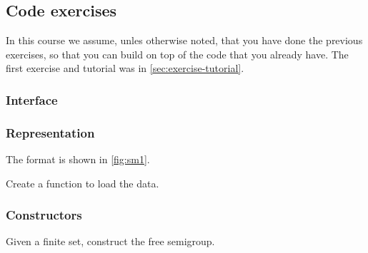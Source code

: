 \subsection{Code exercises}

\begin{remark}
  In this course we assume, unles otherwise noted, that you have done the previous exercises, so that you can build on top of the code that you already have. The first exercise and tutorial was in \cref{sec:exercise-tutorial}.
\end{remark}

\subsubsection*{Interface}


\subsubsection*{Representation}

The format is shown in \cref{fig:sm1}.



\begin{gradedexercise}
  \label{ex:TestFiniteSemigroupRepresentation}
  Create a function to load the data.



\end{gradedexercise}

\subsubsection*{Constructors}

\begin{gradedexercise}
  \label{ex:FiniteSemigroupRepresentation}
  Given a finite set, construct the free semigroup.

\end{gradedexercise}
